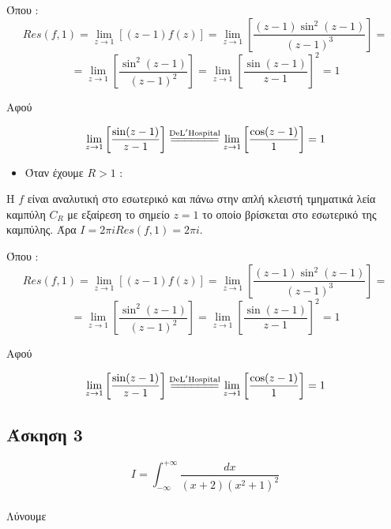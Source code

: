 \documentclass[12pt]{article}
\begin{document}
Όπου :$$Res(f,1) =\lim_{z\to 1}\left[ (z-1)f(z)  \right]=
\lim_{z\to 1}\left[ \frac{(z-1) {\sin^{2}(z-1)}}{(z-1)^{3}}  \right]=
$$ 
$$=\lim_{z\to 1}\left[ \frac{{\sin^{2}(z-1)}}{(z-1)^{2}}  \right]
=\lim_{z\to 1} \left[ \frac{{\sin(z-1)}}{z-1}  \right]^{2}=1$$

Αφού

$$ \lim_{z\to 1} \left[\frac{{\sin(z-1)}}{z-1}\right] \overset{\mathrm{De L'Hospital}}{=\joinrel=\joinrel=\joinrel=\joinrel=\joinrel=\joinrel=} \lim_{z\to 1} \left[ \frac{{\cos(z-1)}}{1}  \right]=1 $$


\begin{itemize}
\item Όταν έχουμε $R>1$ :
\end{itemize}

\newline
Η $f$ είναι αναλυτική στο εσωτερικό και πάνω  στην απλή κλειστή τμηματικά λεία καμπύλη $C_{R}$ με εξαίρεση το σημείο $z=1$ το οποίο βρίσκεται στο εσωτερικό της καμπύλης. Άρα $Ι= 2 \pi i Res(f,1)= 2 \pi i $.

Όπου :$$Res(f,1) =\lim_{z\to 1}\left[ (z-1)f(z)  \right]=
\lim_{z\to 1}\left[ \frac{(z-1) {\sin^{2}(z-1)}}{(z-1)^{3}}  \right]=
$$ 
$$=\lim_{z\to 1}\left[ \frac{{\sin^{2}(z-1)}}{(z-1)^{2}}  \right]
=\lim_{z\to 1} \left[ \frac{{\sin(z-1)}}{z-1}  \right]^{2}=1$$

Αφού

$$ \lim_{z\to 1} \left[\frac{{\sin(z-1)}}{z-1}\right] \overset{\mathrm{De L'Hospital}}{=\joinrel=\joinrel=\joinrel=\joinrel=\joinrel=\joinrel=} \lim_{z\to 1} \left[ \frac{{\cos(z-1)}}{1}  \right]=1 $$


\newpage
 \subsection{Άσκηση 3}

$$I= \int_{-\infty}^{+\infty} \frac{dx}{(x+2)(x^2+1)^2}$$
\\ Λύνουμε
\end{document}
